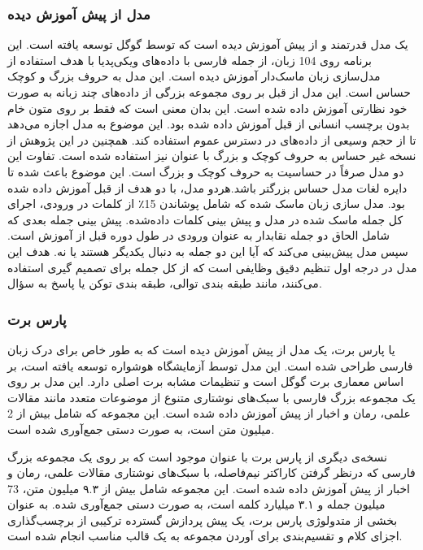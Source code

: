 \subsubsection{  مدل‌ از پیش آموزش دیده   }
\hspace{30pt}
 \cite{bert-multilingual-cased}یک مدل قدرتمند و از پیش آموزش دیده است که توسط گوگل توسعه یافته است. این برنامه روی 104 زبان، از  جمله فارسی با داده‌های ویکی‌پدیا با هدف استفاده از مدل‌سازی زبان ماسک‌دار  آموزش دیده است. این مدل به حروف بزرگ و کوچک حساس است. این مدل از قبل بر روی مجموعه بزرگی از داده‌های چند زبانه به صورت خود نظارتی آموزش داده شده‌ است. این بدان معنی است که فقط بر روی متون خام بدون برچسب انسانی از قبل آموزش داده شده بود. این موضوع به مدل اجازه می‌دهد تا از حجم وسیعی از داده‌های در دسترس عموم استفاده کند.
همچنین در این پژوهش از نسخه غیر حساس به حروف کوچک و بزرگ با عنوان \cite{bert-multilingual-uncased} نیز استفاده شده است. تفاوت این دو مدل صرفاً در حساسیت به حروف کوچک و بزرگ است. این موضوع باعث شده تا دایره لغات مدل حساس بزرگتر باشد.هر‌دو مدل، با دو هدف از قبل آموزش داده شده بود. مدل سازی زبان ماسک شده که شامل پوشاندن 15٪ از کلمات در ورودی، اجرای کل جمله ماسک شده در مدل و پیش بینی کلمات داده‌شده. پیش بینی جمله بعدی که شامل الحاق دو جمله نقابدار به عنوان ورودی در طول دوره قبل از آموزش است. سپس مدل پیش‌بینی می‌کند که آیا این دو جمله به دنبال یکدیگر هستند یا نه.
هدف این مدل در درجه اول تنظیم دقیق وظایفی است که از کل جمله برای تصمیم گیری استفاده می‌کنند، مانند طبقه بندی توالی، طبقه بندی توکن یا پاسخ به سؤال.

\subsubsection{پارس برت}
\hspace{30pt}
\cite{parsbert}  یا پارس برت، یک مدل از پیش آموزش دیده است که به طور خاص برای درک زبان فارسی طراحی شده است. این مدل توسط آزمایشگاه هوشواره توسعه یافته است، بر اساس معماری برت گوگل است و تنظیمات مشابه برت اصلی دارد. این مدل بر روی یک مجموعه بزرگ فارسی با سبک‌های نوشتاری متنوع از موضوعات متعدد مانند مقالات علمی، رمان و اخبار از پیش آموزش داده شده است. این مجموعه که شامل بیش از 2 میلیون متن است، به صورت دستی جمع‌آوری شده است.

نسخه‌ی دیگری از پارس برت با عنوان \cite{parsbert-zwnj} موجود است که بر روی یک مجموعه بزرگ فارسی که درنظر گرفتن کاراکتر نیم‌‌فاصله، با سبک‌های نوشتاری مقالات علمی، رمان و اخبار از پیش آموزش داده شده است. این مجموعه شامل بیش از ۹.۳ میلیون متن، 73 میلیون جمله و ۳.۱ میلیارد کلمه است، به صورت دستی جمع‌آوری شده.
به عنوان بخشی از متدولوژی پارس برت، یک پیش پردازش گسترده ترکیبی از برچسب‌گذاری اجزای کلام و تقسیم‌بندی 
 برای آوردن مجموعه به یک قالب مناسب انجام شده است.

